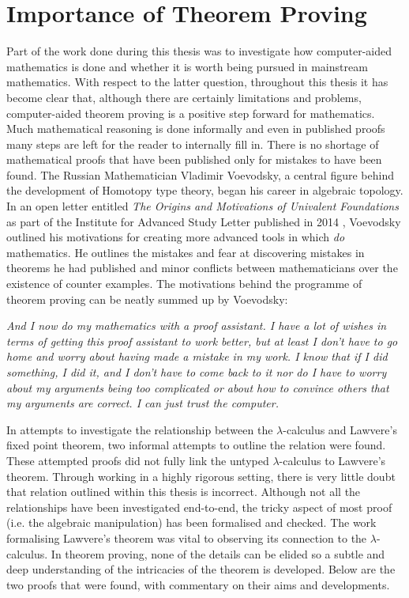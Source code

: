 \section{Importance of Theorem Proving}
Part of the  work done during this thesis was to investigate how computer-aided
mathematics is done and whether it is worth being pursued in mainstream
mathematics. With respect to the latter question, throughout this thesis it has
become clear that, although there are certainly limitations and problems,
computer-aided theorem proving is a positive step forward for mathematics. Much
mathematical reasoning is done informally and even in published proofs many
steps are left for the reader to internally fill in. There is no shortage of
mathematical proofs that have been published only for mistakes to have been
found. The Russian Mathematician Vladimir Voevodsky, a central figure behind the
development of Homotopy type theory, began his career in algebraic topology.  In
an open letter entitled \textit{The Origins and Motivations of Univalent
Foundations} as part of the  Institute for Advanced Study Letter published in 2014 \cite{sorlin2014iasthe}, Voevodsky outlined his
motivations for creating more advanced tools in which \textit{do} mathematics.
He outlines the mistakes and fear at discovering mistakes in theorems he had
published and minor conflicts between mathematicians over the existence of
counter examples. The motivations behind the programme of theorem proving can be
neatly summed up by Voevodsky:

\begin{displayquote}
    \textit{And I now do my mathematics with a proof assistant. I have a lot of wishes
    in terms of getting this proof assistant to work better, but at least I
    don’t have to go home and worry about having made a mistake in my work. I
    know that if I did something, I did it, and I don’t have to come back to it
    nor do I have to worry about my arguments being too complicated or about how
    to convince others that my arguments are correct. I can just trust the
    computer.}
\end{displayquote}

In attempts to investigate the relationship between the $\lambda$-calculus and
Lawvere's fixed point theorem, two informal attempts to outline the relation
were found. These attempted proofs did not fully link the untyped
$\lambda$-calculus to Lawvere's theorem. Through working in a highly rigorous
setting, there is very little doubt that relation outlined within this thesis is
incorrect. Although not all the relationships have been investigated end-to-end,
the tricky aspect of most proof (i.e. the algebraic manipulation) has been
formalised and checked. The work formalising Lawvere's theorem was vital to
observing its connection to the $\lambda$-calculus. In
theorem proving, none of the details can be elided so a subtle and deep
understanding of the intricacies of the theorem is developed. Below are the two
proofs that were found, with commentary on their aims and developments.

